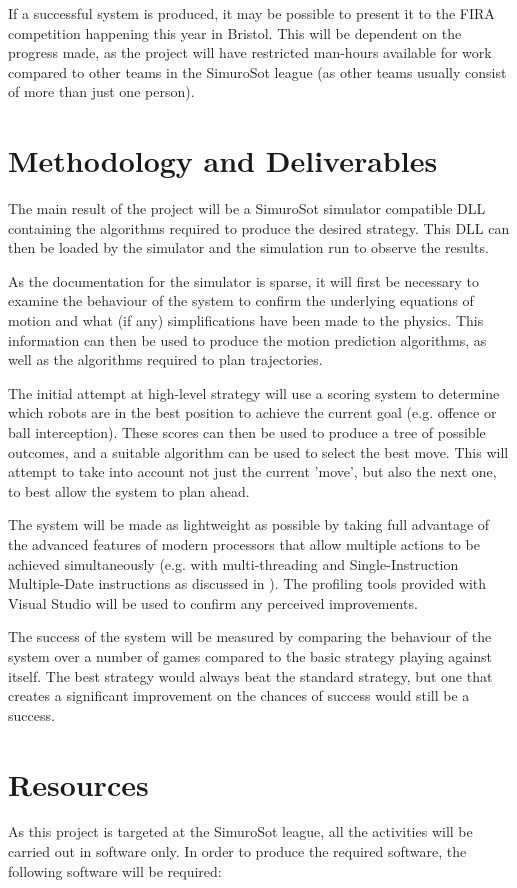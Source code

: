 \documentclass[a4paper,10pt]{article}
\begin{document}
If a successful system is produced, it may be possible to present it to the FIRA competition happening this year in Bristol.  This will be dependent on the progress made, as the project will have restricted man-hours available for work compared to other teams in the SimuroSot league (as other teams usually consist of more than just one person).

\section{Methodology and Deliverables}
The main result of the project will be a SimuroSot simulator compatible DLL containing the algorithms required to produce the desired strategy.  This DLL can then be loaded by the simulator and the simulation run to observe the results.

As the documentation for the simulator is sparse, it will first be necessary to examine the behaviour of the system to confirm the underlying equations of motion and what (if any) simplifications have been made to the physics.  This information can then be used to produce the motion prediction algorithms, as well as the algorithms required to plan trajectories.

The initial attempt at high-level strategy will use a scoring system to determine which robots are in the best position to achieve the current goal (e.g. offence or ball interception).  These scores can then be used to produce a tree of possible outcomes, and a suitable algorithm can be used to select the best move.  This will attempt to take into account not just the current 'move', but also the next one, to best allow the system to plan ahead.

The system will be made as lightweight as possible by taking full advantage of the advanced features of modern processors that allow multiple actions to be achieved simultaneously (e.g. with multi-threading and Single-Instruction Multiple-Date instructions as discussed in \cite{intelMatrixInverse}).  The profiling tools provided with Visual Studio will be used to confirm any perceived improvements.

The success of the system will be measured by comparing the behaviour of the system over a number of games compared to the basic strategy playing against itself.  The best strategy would always beat the standard strategy, but one that creates a significant improvement on the chances of success would still be a success.

\section{Resources}
As this project is targeted at the SimuroSot league, all the activities will be carried out in software only.  In order to produce the required software, the following software will be required:
\end{document}
